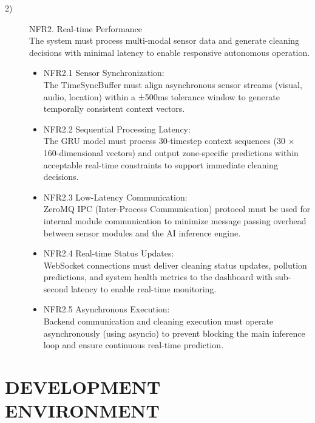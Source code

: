 \documentclass[conference]{IEEEtran}
\begin{document}
\begin{description}
    \item[2)] NFR2. Real-time Performance \\
    The system must process multi-modal sensor data and generate cleaning decisions with minimal latency to enable responsive autonomous operation.
    \begin{itemize}
        \item NFR2.1 Sensor Synchronization: \\
        The TimeSyncBuffer must align asynchronous sensor streams (visual, audio, location) within a ±500ms tolerance window to generate temporally consistent context vectors.
        \item NFR2.2 Sequential Processing Latency: \\
        The GRU model must process 30-timestep context sequences (30 × 160-dimensional vectors) and output zone-specific predictions within acceptable real-time constraints to support immediate cleaning decisions.
        \item NFR2.3 Low-Latency Communication: \\
        ZeroMQ IPC (Inter-Process Communication) protocol must be used for internal module communication to minimize message passing overhead between sensor modules and the AI inference engine.
        \item NFR2.4 Real-time Status Updates: \\
        WebSocket connections must deliver cleaning status updates, pollution predictions, and system health metrics to the dashboard with sub-second latency to enable real-time monitoring.
        \item NFR2.5 Asynchronous Execution: \\
        Backend communication and cleaning execution must operate asynchronously (using asyncio) to prevent blocking the main inference loop and ensure continuous real-time prediction.
    \end{itemize}
\end{description}

\section{DEVELOPMENT ENVIRONMENT}
\end{document}
